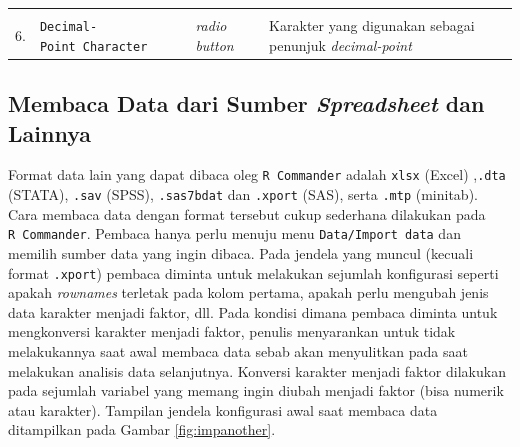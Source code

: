 \documentclass[12pt,]{krantz}
\begin{document}
\begin{longtable}[]{@{}llll@{}}
\begin{minipage}[t]{0.58\columnwidth}
\end{minipage}\tabularnewline
\begin{minipage}[t]{0.04\columnwidth}\raggedright
6.\strut
\end{minipage} & \begin{minipage}[t]{0.17\columnwidth}\raggedright
\texttt{Decimal-Point\ Character}\strut
\end{minipage} & \begin{minipage}[t]{0.10\columnwidth}\raggedright
\emph{radio button}\strut
\end{minipage} & \begin{minipage}[t]{0.58\columnwidth}\raggedright
Karakter yang digunakan sebagai penunjuk \emph{decimal-point}\strut
\end{minipage}\tabularnewline
\bottomrule
\end{longtable}

\hypertarget{membaca-data-dari-sumber-spreadsheet-dan-lainnya}{%
\subsection{\texorpdfstring{Membaca Data dari Sumber \emph{Spreadsheet} dan Lainnya}{Membaca Data dari Sumber Spreadsheet dan Lainnya}}\label{membaca-data-dari-sumber-spreadsheet-dan-lainnya}}

Format data lain yang dapat dibaca oleg \texttt{R\ Commander} adalah \texttt{xlsx} (Excel) ,\texttt{.dta} (STATA), \texttt{.sav} (SPSS), \texttt{.sas7bdat} dan \texttt{.xport} (SAS), serta \texttt{.mtp} (minitab). Cara membaca data dengan format tersebut cukup sederhana dilakukan pada \texttt{R\ Commander}. Pembaca hanya perlu menuju menu \texttt{Data/Import\ data} dan memilih sumber data yang ingin dibaca. Pada jendela yang muncul (kecuali format \texttt{.xport}) pembaca diminta untuk melakukan sejumlah konfigurasi seperti apakah \emph{rownames} terletak pada kolom pertama, apakah perlu mengubah jenis data karakter menjadi faktor, dll. Pada kondisi dimana pembaca diminta untuk mengkonversi karakter menjadi faktor, penulis menyarankan untuk tidak melakukannya saat awal membaca data sebab akan menyulitkan pada saat melakukan analisis data selanjutnya. Konversi karakter menjadi faktor dilakukan pada sejumlah variabel yang memang ingin diubah menjadi faktor (bisa numerik atau karakter). Tampilan jendela konfigurasi awal saat membaca data ditampilkan pada Gambar \ref{fig:impanother}.
\end{document}
